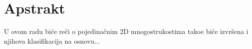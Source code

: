\chapter*{Apstrakt}

U ovom radu bi\' ce re\v ci o pojedina\v cnim 2D mnogostrukostima tako\dj e bi\' ce izvr\v sena i njihova klasifikacija na osnovu...